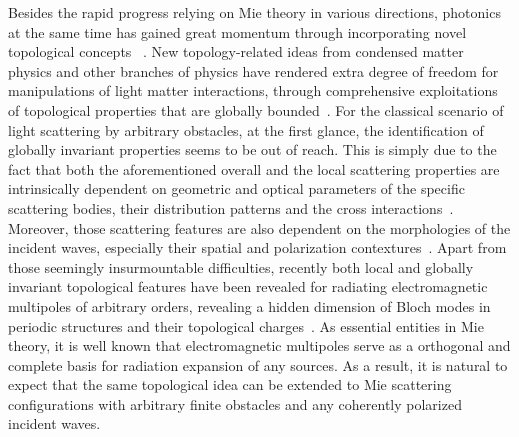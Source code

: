 \documentclass[aps,twocolumn,superscriptaddress]{revtex4-1}
\begin{document}
Besides the rapid progress relying on Mie theory in various directions, photonics at the same time has gained great momentum through incorporating novel topological concepts ~\cite{Lu2014_topological,OZAWA_2018_ArXiv180204173}. New topology-related ideas from condensed matter physics and other branches of physics have rendered  extra degree of freedom for manipulations of light matter interactions, through comprehensive exploitations of topological properties that are globally bounded~\cite{Lu2014_topological,OZAWA_2018_ArXiv180204173}. For the classical scenario of light scattering by arbitrary obstacles, at the first glance, the identification of globally invariant properties seems to be out of reach. This is simply due to the fact that both the aforementioned overall and the local scattering properties are intrinsically dependent on geometric and optical parameters of the specific scattering bodies, their distribution patterns and the cross interactions~\cite{Bohren1983_book,DOICU_light_2006}. Moreover, those scattering features are also dependent on the morphologies of the incident waves, especially their spatial and polarization contextures~\cite{GOUESBET_generalized_2011}. Apart from those seemingly insurmountable difficulties, recently both local and globally invariant topological features have been revealed for radiating electromagnetic multipoles of arbitrary orders, revealing a hidden dimension of Bloch modes in periodic structures and their topological charges~\cite{CHEN_2019__Singularities,CHEN_2019_ArXiv190409910Math-PhPhysicsphysics_Linea}. As essential entities in Mie theory,  it is well known that electromagnetic multipoles serve as a orthogonal and complete basis for radiation expansion of any sources. As a result, it is natural to expect that the same topological idea can be extended to Mie scattering configurations with arbitrary finite obstacles and any coherently polarized incident waves.
\end{document}
